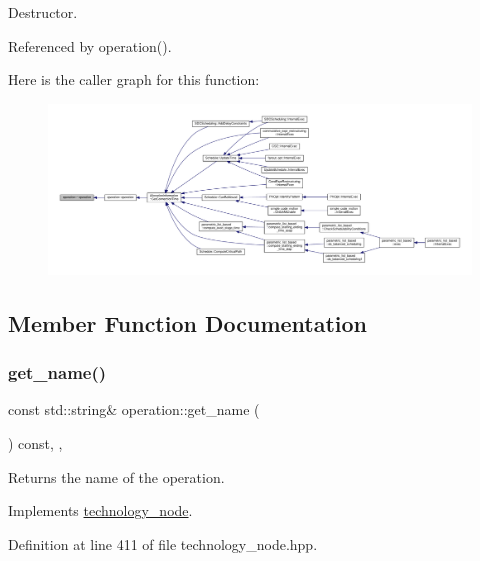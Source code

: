 Destructor. 



Referenced by operation().

Here is the caller graph for this function\+:
\nopagebreak
\begin{figure}[H]
\begin{center}
\leavevmode
\includegraphics[width=350pt]{d9/dc0/structoperation_aa513f0c61b49ef30a3a8b49fc3eb5874_icgraph}
\end{center}
\end{figure}


\subsection{Member Function Documentation}
\mbox{\label{structoperation_af507cadd6f2ee17b88e7cb62772fe1f2}} 
\subsubsection{\texorpdfstring{get\+\_\+name()}{get\_name()}}
{\footnotesize\ttfamily const std\+::string\& operation\+::get\+\_\+name (\begin{DoxyParamCaption}{ }\end{DoxyParamCaption}) const\hspace{0.3cm}{\ttfamily [inline]}, {\ttfamily [override]}, {\ttfamily [virtual]}}



Returns the name of the operation. 



Implements \hyperlink{structtechnology__node_ade1d568637cfe8de91fc732fba4d62d5}{technology\+\_\+node}.



Definition at line 411 of file technology\+\_\+node.\+hpp.



